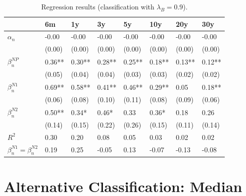 \documentclass[11pt,a4paper,english,oneside]{book}
\numberwithin{equation}{chapter}
\begin{document}
\begin{table}[h] %
	\centering %
	\begin{tabular}{ p{2cm}  p{1cm} p{1cm} p{1cm} p{1cm} p{1cm} p{1cm} p{1cm} } %
		\toprule %
		& 6m 		& 1y 		& 3y 		& 5y 		& 10y 		& 20y 		& 30y \\
		\midrule %
		$\alpha_n$ & -0.00 & -0.00 & -0.00 & -0.00 & -0.00 & -0.00 & -0.00\\
		& (0.00) & (0.00) & (0.00) & (0.00) & (0.00) & (0.00) & (0.00)\\
		$\beta_n^{NP}$ & 0.36** & 0.30** & 0.28** & 0.25** & 0.18** & 0.13** & 0.12**\\
		& (0.05) & (0.04) & (0.04) & (0.03) & (0.03) & (0.02) & (0.02)\\
		$\beta_n^{N1}$ & 0.69** & 0.58** & 0.41** & 0.46** & 0.29** & 0.05 & 0.18**\\
		& (0.06) & (0.08) & (0.10) & (0.11) & (0.08) & (0.09) & (0.06)\\
		$\beta_n^{N2}$ & 0.50** & 0.34* & 0.46* & 0.33 & 0.36* & 0.18 & 0.26\\
		& (0.14) & (0.15) & (0.22) & (0.26) & (0.15) & (0.11) & (0.14)\\
		$R^2$ & 0.30 & 0.20 & 0.08 & 0.05 & 0.03 & 0.02 & 0.02\\
		$\beta_n^{N1} = \beta_n^{N2}$ & 0.19 & 0.25 & -0.05 & 0.13 & -0.07 & -0.13 & -0.08\\
		\bottomrule %
	\end{tabular}
	\caption{Regression results (classification with $\lambda_B=0.9$).} %
	\label{tab:reg3} %
\end{table}

\renewcommand{\theequation}{E.\arabic{equation}}


\chapter{Alternative Classification: Median}\label{AppendixE}
\end{document}
